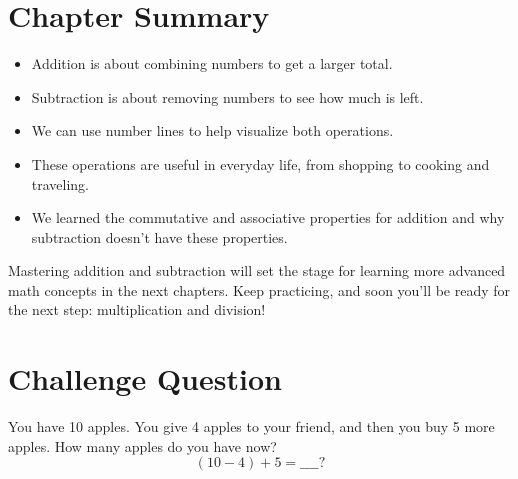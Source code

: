\section{Chapter Summary}
\begin{itemize}
    \item Addition is about combining numbers to get a larger total.
    \item Subtraction is about removing numbers to see how much is left.
    \item We can use number lines to help visualize both operations.
    \item These operations are useful in everyday life, from shopping to cooking and traveling.
    \item We learned the commutative and associative properties for addition and why subtraction doesn’t have these properties.
\end{itemize}

Mastering addition and subtraction will set the stage for learning more advanced math concepts in the next chapters. Keep practicing, and soon you’ll be ready for the next step: multiplication and division!

\section{Challenge Question}
You have 10 apples. You give 4 apples to your friend, and then you buy 5 more apples. How many apples do you have now?
\begin{equation*}
(10 - 4) + 5 = \_\_\_\_?
\end{equation*}
